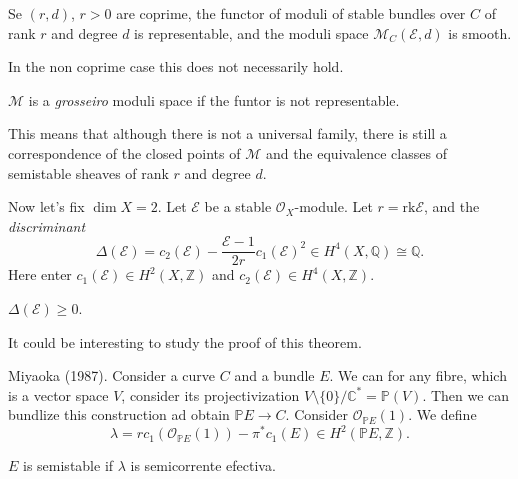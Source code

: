 \begin{example}
\label{example-hilbert-polynomial-sheaf}
\end{example}

\begin{theorem}
\label{theorem-moduli-suave}
Se $(r,d)$, $r>0$ are coprime,
the functor of moduli of stable bundles
over $C$ of rank $r$ and degree $d$
is representable, and the moduli space
$\mathcal{M}_C(\mathcal{E},d)$ is smooth.
\end{theorem}

\noindent
In the non coprime case this does not
necessarily hold.

\begin{definition}
\label{definition-}
$\mathcal{M}$ is a {\it grosseiro} moduli
space
if the funtor is not representable.
\end{definition}

\noindent
This means that although there is not
a universal family,
there is still a correspondence
of the closed points of $\mathcal{M}$ and the
equivalence classes of semistable sheaves
of rank $r$ and degree $d$.

\medskip\noindent
Now let's fix $\dim X=2$.
Let $\mathcal{E}$ be a stable
$\mathcal{O}_X$-module.
Let $r=\text{rk}\mathcal{E}$,
and the {\it discriminant}
$$
\Delta(\mathcal{E})=c_2(\mathcal{E})-
\frac{\mathcal{E}-1}{2r}c_1(\mathcal{E})^2
\in H^4(X,\mathbb{Q})\cong\mathbb{Q}.
$$
Here enter $c_1(\mathcal{E}) \in
H^2(X,\mathbb{Z})$
and $c_2(\mathcal{E}) \in H^4(X,\mathbb{Z})$.

\begin{theorem}[Bogomolov]
\label{theorem-bogomolov}
$\Delta(\mathcal{E}) \geq 0$.
\end{theorem}

\noindent
It could be interesting to study the proof of
this theorem.

\medskip\noindent
Miyaoka (1987). Consider a curve $C$ and a
bundle $E$.
We can for any fibre, which is a vector space
$V$,
consider its projectivization
$V\setminus\{0\}/\mathbb{C}^*=\mathbb{P}(V)$.
Then we can bundlize this construction ad
obtain
$\mathbb{P}E \to C$.
Consider $\mathcal{O}_{\mathbb{P}E}(1)$.
We define
$$
\lambda=rc_1(\mathcal{O}_{\mathbb{P}E}(1))
-\pi^*c_1(E) \in H^2(\mathbb{P}E,\mathbb{Z}).
$$

\begin{theorem}
\label{theorem-semistable-nef}
$E$ is semistable if $\lambda$ is
semicorrente efectiva.
\end{theorem}

